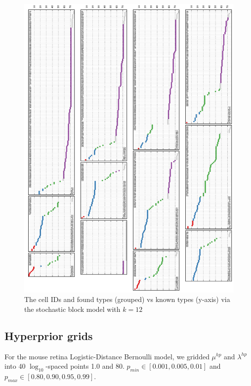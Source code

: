 \documentclass{nature}
\begin{document}
\begin{figure}[h!]

  \centering 
    \centerline{\includegraphics[width=6.0in]{mouseretina/retina.1.2.bb.0.0.data-fixed_20_12-anneal_slow_fixed_400.truth_latent.pdf}}
  \caption{The cell IDs and found types (grouped) vs known types (y-axis) via the stochastic block model with $k=12$}
\label{fig:supp:retinabbfixedclusters}
\end{figure}


\newpage

\FloatBarrier
\subsection{Hyperprior grids}
\label{supp:hyperpriors}

For the mouse retina Logistic-Distance Bernoulli model, we gridded $\mu^{hp}$ and $\lambda^{hp}$ into 40 $\log_{10}$-spaced points 1.0 and 80. $p_{min} \in [0.001, 0.005, 0.01]$ and $p_{max} \in [0.80, 0.90, 0.95, 0.99]$.
\end{document}
